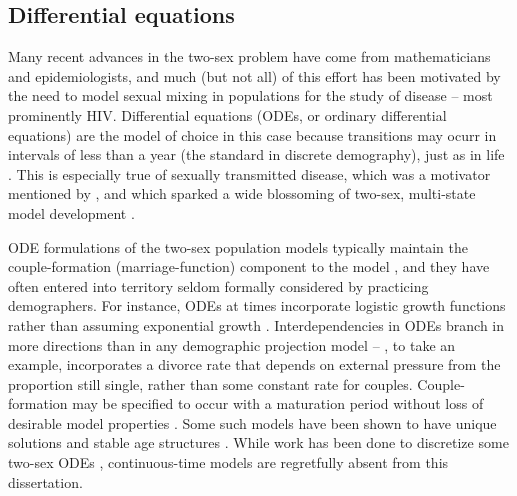 \subsection{Differential equations} 
Many recent advances in the two-sex problem
have come from mathematicians and epidemiologists, and much (but not all) of
this effort has been motivated by the need to model sexual mixing in
populations for the study of disease -- most prominently HIV. Differential
equations (ODEs, or ordinary differential equations) are the model of choice in
this case because transitions may ocurr in intervals of less than a year 
(the standard in discrete demography), just as in
life \citep{hoppensteadt1975mathematical}. This is especially true of sexually
transmitted disease, which was a motivator mentioned by \citet{hadeler1988models}, and which sparked a wide blossoming
of two-sex, multi-state model development
\citep{dietz1988epidemiological,hadeler1989pair,busenberg1991general,blythe1991toward}.

ODE formulations of the two-sex population models typically maintain the
couple-formation (marriage-function) component to the model
\citep{Fredrickson1971,inaba1992age} 
\citep[see e.g.,][for a good overview]{ianelli2005gender}, and they have often
entered into territory seldom formally considered by practicing demographers. For instance,
ODEs at times incorporate logistic growth
functions \citep{castillo1995logistic,yang2009logisticwb,yang2009logistic}
rather than assuming exponential growth \citep{martcheva1999exponential}.
Interdependencies in ODEs branch in more directions than in any demographic
projection model -- \citet{maxin2010two}, to take an example, incorporates a 
divorce rate that depends on external pressure from the proportion still single,
rather than some constant rate for couples. Couple-formation may be
specified to occur with a maturation period without
loss of desirable model properties \citep{hadeler1993pair}. Some such models
have been shown to have unique solutions \citep{martcheva1999two} and stable age
structures \citep{inaba2000persistent}. While work has been done to
discretize some two-sex ODEs \citep{arbogast1989finite,
martcheva2001mathematics, ianelli2005gender}, continuous-time models are
regretfully absent from this dissertation.


